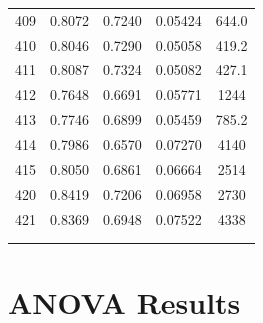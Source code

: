 \documentclass[11pt,twocolumn]{article}
\begin{document}
\begin{center}
\begin{tabular}{ccccc}
409    &     0.8072 &      0.7240 &        0.05424 &            644.0 \\
410    &     0.8046 &      0.7290 &        0.05058 &            419.2 \\
411    &     0.8087 &      0.7324 &        0.05082 &            427.1 \\
412    &     0.7648 &      0.6691 &        0.05771 &             1244 \\
413    &     0.7746 &      0.6899 &        0.05459 &            785.2 \\
414    &     0.7986 &      0.6570 &        0.07270 &             4140 \\
415    &     0.8050 &      0.6861 &        0.06664 &             2514 \\
420    &     0.8419 &      0.7206 &        0.06958 &             2730 \\
421    &     0.8369 &      0.6948 &        0.07522 &             4338 \\
\bottomrule
{}	&	{}	&	{}	&	{}	&	{}	\\
{}	&	{}	&	{}	&	{}	&	{}	\\
\end{tabular}
\end{center}

\newpage
\section{ANOVA Results}
\label{app_anova}
\end{document}
